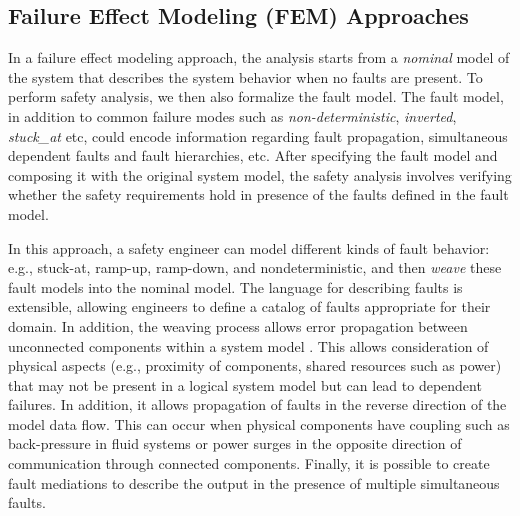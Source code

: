 \subsection{Failure Effect Modeling (FEM) Approaches}


In a failure effect modeling approach, the analysis starts from a {\em nominal} model of the system that describes the system behavior when no faults are present.  To perform safety analysis, we then also formalize the fault model. The fault model, in addition to common failure modes such as \emph{non-deterministic}, \emph{inverted}, \emph{stuck\_at} etc, could encode information
regarding fault propagation, simultaneous dependent faults and fault hierarchies, etc.
After specifying the fault model and composing it with the original system model, the safety analysis involves verifying whether the safety requirements hold in presence of the faults defined in the fault model.


In this approach, a safety engineer can model different kinds of fault behavior: e.g., stuck-at, ramp-up, ramp-down, and nondeterministic, and then {\em weave} these fault models into the nominal model. The language for describing faults is extensible, allowing engineers to define a catalog of faults appropriate for their domain. In addition, the weaving process allows error propagation between unconnected components within a system model \cite{Joshi07:Hase}. This allows consideration of physical aspects (e.g., proximity of components, shared resources such as power) that may not be present in a logical system model but can lead to dependent failures. In addition, it allows propagation of faults in the reverse direction of the model data flow. This can occur when physical components have coupling such as back-pressure in fluid systems or power surges in the opposite direction of communication through connected components. Finally, it is possible to create fault mediations to describe the output in the presence of multiple simultaneous faults.



